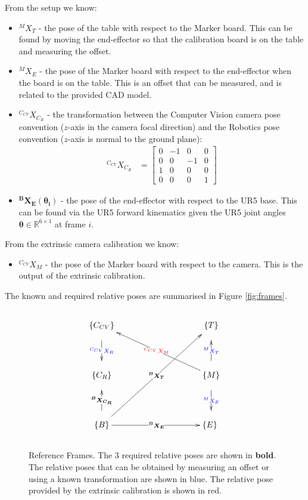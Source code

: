 \documentclass[10pt,a4paper]{article}
\begin{document}
From the setup we know:
\begin{itemize}
	\itemsep0em
	\item $^{M}X_T$ - the pose of the table with respect to the Marker board. This can be found by moving the end-effector so that the calibration board is on the table and measuring the offset.
	\item $^{M}X_{E}$ - the pose of the Marker board with respect to the end-effector when the board is on the table. This is an offset that can be measured, and is related to the provided CAD model.
	\item $^{C_{CV}}X_{C_R}$ - the transformation between the Computer Vision camera pose convention ($z$-axis in the camera focal direction) and the Robotics pose convention ($z$-axis is normal to the ground plane):
	\begin{align*}
	^{C_{CV}}X_{C_R}&=
	\begin{bmatrix}
	0 & -1 & 0 & 0 \\
	0 & 0 & -1 & 0 \\
	1 & 0 & 0 & 0 \\
	0 & 0 & 0 & 1
	\end{bmatrix}
	\end{align*} 
	\item $\bm{^BX_E(\bm{\theta}_i)}$ - the pose of the end-effector with respect to the UR5 base. This can be found via the UR5 forward kinematics  given the UR5 joint angles $\bm{\theta}\in\mathbb{R}^{6\times1}$ at frame $i$.
\end{itemize}

From the extrinsic camera calibration we know:
\begin{itemize}
	\item $^{C_{CV}}X_M$ - the pose of the Marker board with respect to the camera. This is the output of the extrinsic calibration. 
\end{itemize}

\noindent The known and required relative poses are summarised in Figure \ref{fig:frames}.
\begin{figure}[H]
\begin{displaymath}
\xymatrix@C=10em@H=3em{ \{C_{CV}\} \ar[d]|{\color{blue}^{C_{CV}}X_R} & \{T\}  \\
	\{C_R\}  & \{M\} \ar[lu]|{\color{red}\mbox{}^{C_{CV}}X_M} \ar[u]|{\color{blue}^MX_T}\ar[d]|{\color{blue}^MX_E}\\
	\{B\}\ar[ruu]|{\bm{^BX_T}} \ar[u]|{\bm{^BX_{C_R}}} \ar[r]|{\bm{^BX_{E}}} & \{E\} \ }
\label{fig:frames}
\end{displaymath}
\caption{Reference Frames. The 3 required relative poses are shown in \textbf{bold}. The relative poses that can be obtained by measuring an offset or using a known transformation are shown in {\color{blue}blue}. The relative pose provided by the extrinsic calibration is shown in {\color{red}red}.}
\end{figure}
\end{document}
